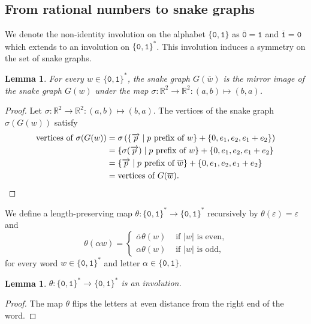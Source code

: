 \documentclass[a4paper,12pt]{amsart}
\newtheorem{lemma}[definition]{Lemma}
\newcommand{\R}{\mathbb{R}}
\newcommand{\0}{\mathtt{0}}
\newcommand{\1}{\mathtt{1}}
\newcommand{\2}{\mathtt{2}}
\newcommand{\3}{\mathtt{3}}
\begin{document}
\subsection{From rational numbers to snake graphs}

We denote the non-identity involution on the alphabet $\{\0,\1\}$ as
$\overline{\0}=\1$ and $\overline{\1}=\0$ which extends
to an involution on $\{\0,\1\}^*$. This involution
induces a symmetry on the set of snake graphs.

\begin{lemma}\label{lem:G-wbar-is-symmetric-to-Gw}
    For every $w\in\{\0,\1\}^*$,
    the snake graph $G(\overline{w})$
    is the mirror image of the snake graph $G(w)$
    under the map $\sigma:\R^2\to\R^2:(a,b)\mapsto (b,a)$.
\end{lemma}

\begin{proof}
    Let $\sigma:\R^2\to\R^2:(a,b)\mapsto(b,a)$. The vertices
    of the snake graph $\sigma(G(w))$ satisfy
\begin{align*}
    \text{vertices of } \sigma(G(w))
    &= \sigma\left(\{\overrightarrow{p}\mid \text{$p$ prefix of $w$}\}
        + \{0, e_1,e_2, e_1+e_2\}\right)\\
    &= \{\sigma(\overrightarrow{p})\mid \text{$p$ prefix of $w$}\}
        + \{0, e_1,e_2, e_1+e_2\}\\
    &= \{\overrightarrow{p}\mid \text{$p$ prefix of $\overline{w}$}\}
        + \{0, e_1,e_2, e_1+e_2\}\\
    &= \text{vertices of } G(\overline{w}).\qedhere
\end{align*}
\end{proof}



We define a length-preserving map
$\theta:\{\0,\1\}^*\to\{\0,\1\}^*$
recursively by $\theta(\varepsilon)=\varepsilon$ and
\[
    \theta(\alpha w)=
    \begin{cases}
        \overline{\alpha}\theta(w) & \text{ if $|w|$ is even,}\\
        \alpha\theta(w)            & \text{ if $|w|$ is odd,}
    \end{cases}
\]
for every word $w\in\{\0,\1\}^*$ and letter $\alpha\in\{\0,\1\}$.

\begin{lemma}
$\theta:\{\0,\1\}^*\to\{\0,\1\}^*$ is an involution.
\end{lemma}

\begin{proof}
The map $\theta$ flips the letters at even distance
from the right end of the word.
\end{proof}
\end{document}
